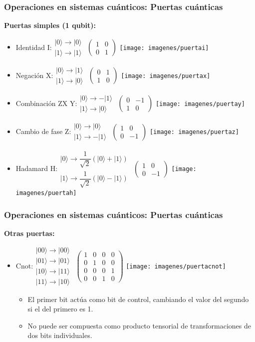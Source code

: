 \documentclass{beamer}
\newcommand{\filados}[2]{ \left. \begin{array}{c}	#1 \\	#2	 \end{array} \right. }
\newcommand{\filacuatro}[4]{ \left. \begin{array}{c}#1\\#2\\#3\\#4	\end{array} \right.}
\newcommand{\base}[1]{|#1\rangle}
\newcommand{\puertai}{\texttt{[image: imagenes/puertai]}}
\newcommand{\puertax}{\texttt{[image: imagenes/puertax]}}
\newcommand{\puertay}{\texttt{[image: imagenes/puertay]}}
\newcommand{\puertaz}{\texttt{[image: imagenes/puertaz]}}
\newcommand{\puertah}{\texttt{[image: imagenes/puertah]}}
\newcommand{\puertacnot}{\texttt{[image: imagenes/puertacnot]}}
\begin{document}
\begin{frame}
	\frametitle{Operaciones en sistemas cuánticos: Puertas cuánticas}
	\textbf{Puertas simples (1 qubit):}
	\begin{itemize}
	\item Identidad I:$\filados{\base0\to\base0}{\base1\to\base1}$
	$\left({\begin{array}{cc}1&0\\0&1\end{array} } \right)$ \puertai
	
	\item Negación X:$\filados{\base0\to\base1}{\base1\to\base0}$
	$\left({\begin{array}{cc}0&1\\1&0\end{array} } \right)$ \puertax
	
	\item Combinación ZX Y:$\filados{\base0\to-\base{1}}{\base1\to\base0}$
	$\left({\begin{array}{cc}0&-1\\1&0\end{array} } \right)$ \puertay
	
	\item Cambio de fase Z:$\filados{\base0\to\base0}{\base1\to-\base1}$ 
	$\left({\begin{array}{cc}1&0\\0&-1\end{array} } \right)$ \puertaz
	
	\item Hadamard H:$\filados{\base0\to\dfrac{1}{\sqrt{2}}(\base0 + \base1)}{\base1\to\dfrac{1}{\sqrt{2}}(\base0 - \base1)}$ 
	$\left({\begin{array}{cc}1&0\\0&-1\end{array} } \right)$ \puertah
	\end{itemize}
\end{frame}

\begin{frame}
	\frametitle{Operaciones en sistemas cuánticos: Puertas cuánticas}
	\textbf{Otras puertas:}
	\begin{itemize}
	\item Cnot:$\filacuatro{\base{00}\to\base{00}}{\base{01}\to\base{01}}{\base{10}\to\base{11}}{\base{11}\to\base{10}}$
	$\left({\begin{array}{cccc}1&0&0&0\\0&1&0&0\\0&0&0&1\\0&0&1&0\end{array} } \right)$ \puertacnot
		\begin{itemize}
		\item El primer bit actúa como bit de control, cambiando el valor del segundo si el del primero es 1.
		\item No puede ser compuesta como producto tensorial de transformaciones de dos bits individuales.
		\end{itemize}
	
	
	\end{itemize}
\end{frame}
\end{document}
